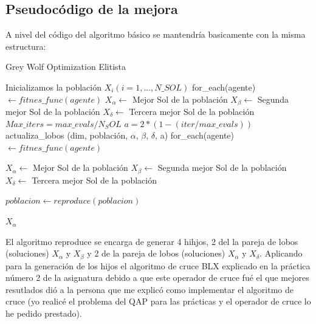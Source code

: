 \documentclass[a4paper]{report}
\begin{document}
\subsection{Pseudocódigo de la mejora}

A nivel del código del algoritmo básico se mantendría basicamente con la misma estructura:

\begin{algorithm}[H]
    \caption{Grey Wolf Optimization Elitista}\label{alg:GWO_mejorado}
    \begin{algorithmic}[1]
        \State Inicializamos la población $X_i (i=1,...,N\_SOL)$
        \State for\_each(agente) $ \gets fitnes\_func(agente)$
        \State $X_\alpha \gets$ Mejor Sol de la población
        \State $X_\beta \gets$ Segunda mejor Sol de la población
        \State $X_\delta \gets$ Tercera mejor Sol de la población
        \State $Max\_iters=max\_evals/N_SOL$
        \State $a=2*(1-(iter/max\_evals))$
        \State actualiza\_lobos (dim, población, $\alpha$, $\beta$, $\delta$, a)
        \State for\_each(agente) $ \gets fitnes\_func(agente)$

        \State $X_\alpha \gets$ Mejor Sol de la población
        \State $X_\beta \gets$ Segunda mejor Sol de la población
        \State $X_\delta \gets$ Tercera mejor Sol de la población

        \State $poblacion \gets reproduce(poblacion)$ 


        \EndFor

        \Return $X_\alpha $
        \EndFunction


    \end{algorithmic}
\end{algorithm}


El algoritmo reproduce se encarga de generar 4 hihjos, 2 del la pareja de lobos (soluciones) $X_\alpha$ y $X_\beta$ y 2 de la pareja de lobos (soluciones) $X_\alpha$ y $X_\delta$. Aplicando para la generación de los hijos el algoritmo de cruce BLX explicado en la práctica número 2 de la asignatura debido a que este operador de cruce fué el que mejores resutlados dió a la persona que me explicó como implementar el algoritmo de cruce (yo realicé el problema del QAP para las prácticas y el operador de cruce lo he pedido prestado).
\end{document}
